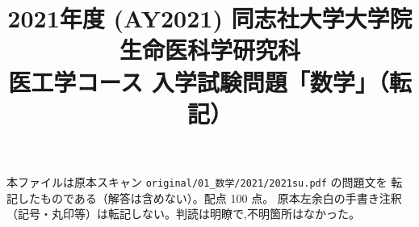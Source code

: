 \documentclass[11pt,a4paper]{article}
\title{2021年度 (AY2021) 同志社大学大学院 生命医科学研究科\\
医工学コース 入学試験問題「数学」（転記）}
\author{}
\date{}
\begin{document}
\maketitle
\vspace{-3em}

\begin{rem}
本ファイルは原本スキャン \texttt{original/01\_数学/2021/2021su.pdf} の問題文を
転記したものである（解答は含めない）。配点 100 点。
原本左余白の手書き注釈（記号・丸印等）は転記しない。判読は明瞭で,不明箇所はなかった。
\end{rem}

\bigskip

\bigskip

\bigskip

\bigskip

\end{document}
